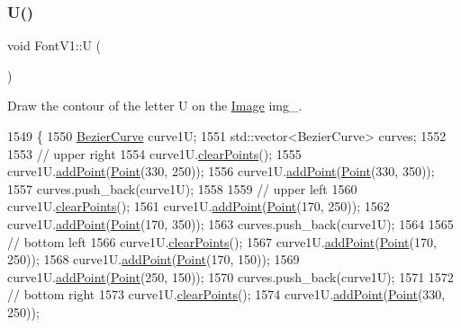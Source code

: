 \subsubsection{\texorpdfstring{U()}{U()}}
{\footnotesize\ttfamily void Font\+V1\+::U (\begin{DoxyParamCaption}{ }\end{DoxyParamCaption})}



Draw the contour of the letter U on the \mbox{\hyperlink{class_image}{Image}} img\+\_\+. 


\begin{DoxyCode}
1549                \{
1550     \mbox{\hyperlink{class_bezier_curve}{BezierCurve}} curve1U;
1551     std::vector<BezierCurve> curves;
1552 
1553     \textcolor{comment}{// upper right}
1554     curve1U.\mbox{\hyperlink{class_bezier_curve_a0ba8ce66d5af5971ae6a1b506029728e}{clearPoints}}();
1555     curve1U.\mbox{\hyperlink{class_bezier_curve_a38d16c18b36ae45619b05e26e226cf34}{addPoint}}(\mbox{\hyperlink{class_point}{Point}}(330, 250));
1556     curve1U.\mbox{\hyperlink{class_bezier_curve_a38d16c18b36ae45619b05e26e226cf34}{addPoint}}(\mbox{\hyperlink{class_point}{Point}}(330, 350));
1557     curves.push\_back(curve1U);
1558 
1559     \textcolor{comment}{// upper left}
1560     curve1U.\mbox{\hyperlink{class_bezier_curve_a0ba8ce66d5af5971ae6a1b506029728e}{clearPoints}}();
1561     curve1U.\mbox{\hyperlink{class_bezier_curve_a38d16c18b36ae45619b05e26e226cf34}{addPoint}}(\mbox{\hyperlink{class_point}{Point}}(170, 250));
1562     curve1U.\mbox{\hyperlink{class_bezier_curve_a38d16c18b36ae45619b05e26e226cf34}{addPoint}}(\mbox{\hyperlink{class_point}{Point}}(170, 350));
1563     curves.push\_back(curve1U);
1564 
1565     \textcolor{comment}{// bottom left}
1566     curve1U.\mbox{\hyperlink{class_bezier_curve_a0ba8ce66d5af5971ae6a1b506029728e}{clearPoints}}();
1567     curve1U.\mbox{\hyperlink{class_bezier_curve_a38d16c18b36ae45619b05e26e226cf34}{addPoint}}(\mbox{\hyperlink{class_point}{Point}}(170, 250));
1568     curve1U.\mbox{\hyperlink{class_bezier_curve_a38d16c18b36ae45619b05e26e226cf34}{addPoint}}(\mbox{\hyperlink{class_point}{Point}}(170, 150));
1569     curve1U.\mbox{\hyperlink{class_bezier_curve_a38d16c18b36ae45619b05e26e226cf34}{addPoint}}(\mbox{\hyperlink{class_point}{Point}}(250, 150));
1570     curves.push\_back(curve1U);
1571 
1572     \textcolor{comment}{// bottom right}
1573     curve1U.\mbox{\hyperlink{class_bezier_curve_a0ba8ce66d5af5971ae6a1b506029728e}{clearPoints}}();
1574     curve1U.\mbox{\hyperlink{class_bezier_curve_a38d16c18b36ae45619b05e26e226cf34}{addPoint}}(\mbox{\hyperlink{class_point}{Point}}(330, 250));

\end{DoxyCode}
